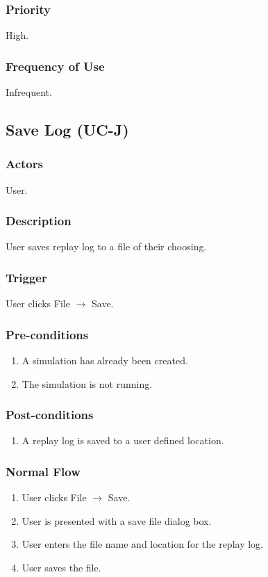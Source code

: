 \documentclass[a4paper,11pt,titlepage]{article}
\newcommand{\ra}{
  $\rightarrow$ \xspace
}
\begin{document}
\subsubsection{Priority}
High.

\subsubsection{Frequency of Use}
Infrequent.


\subsection{Save Log (UC-J)}
\subsubsection{Actors}
User.
\subsubsection{Description}
User saves replay log to a file of their choosing.
\subsubsection{Trigger}
User clicks File \ra Save. 
\subsubsection{Pre-conditions}

\begin{enumerate}
  \item A simulation has already been created.
  \item The simulation is not running.
\end{enumerate}

\subsubsection{Post-conditions}
 
\begin{enumerate}
  \item A replay log is saved to a user defined location.
\end{enumerate}

\subsubsection{Normal Flow}
\begin{enumerate}
  \item User clicks File \ra Save. 
  \item User is presented with a save file dialog box.
  \item User enters the file name and location for the replay log.
  \item User saves the file.
\end{enumerate}
\end{document}
